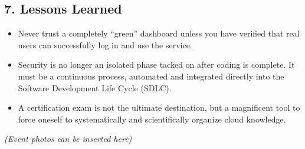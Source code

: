 \hypertarget{lessons-learned}{%
\subsection{7. Lessons Learned}}

\begin{itemize}
\tightlist
\item
  Never trust a completely ``green'' dashboard unless you have verified
  that real users can successfully log in and use the service.
\item
  Security is no longer an isolated phase tacked on after coding is
  complete. It must be a continuous process, automated and integrated
  directly into the Software Development Life Cycle (SDLC).
\item
  A certification exam is not the ultimate destination, but a
  magnificent tool to force oneself to systematically and scientifically
  organize cloud knowledge.
\end{itemize}

\emph{(Event photos can be inserted here)}
